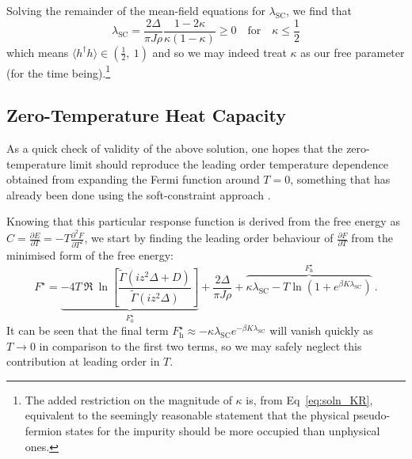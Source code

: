 \documentclass[12pt]{article}
\begin{document}
Solving the remainder of the mean-field equations for $ \lambda_{\text{SC}} $, we find that
\begin{equation}
\lambda_{\text{SC}} = \frac{2 \Delta}{\pi J \rho} \frac{1 - 2 \kappa}{\kappa (1 - \kappa)} \geq 0 \quad \text{for} \quad \kappa \leq \frac{1}{2}
\label{eq:soln_lambda_SC} %
\end{equation} which means $ \langle h^{\dagger} h \rangle \in (\frac{1}{2}, ~ 1) $ and so we may indeed treat $ \kappa $ as our free parameter (for the time being).\footnote{The added restriction on the magnitude of $ \kappa $ is, from Eq~\eqref{eq:soln_KR}, equivalent to the seemingly reasonable statement that the physical pseudo-fermion states for the impurity should be more occupied than unphysical ones.}

\subsection{Zero-Temperature Heat Capacity}

As a quick check of validity of the above solution, one hopes that the zero-temperature limit should reproduce the leading order temperature dependence obtained from expanding the Fermi function around $ T = 0 $, something that has already been done using the soft-constraint approach \cite{Draft}.

Knowing that this particular response function is derived from the free energy as $ C = \frac{\partial E}{\partial T} = - T \frac{\partial^{2} F}{\partial T ^2} $, we start by finding the leading order behaviour of $ \frac{\partial F}{\partial T} $ from the minimised form of the free energy:
\begin{equation}
F^{\star} = \underbrace{- 4 T ~ \Re{ ~ \ln{\left[ \frac{\widetilde{\Gamma}(i z^2 \Delta + D)}{\widetilde{\Gamma}(i z^2 \Delta)} \right]}}}_{F_0^{\star}} + \frac{2 \Delta}{\pi J \rho} + \overbrace{\kappa \lambda_{\text{SC}}  - T \ln{\left( 1 + e^{\beta K \lambda_{\text{SC}}} \right)}}^{F_{\text{h}}^{\star}} ~ .
\end{equation}
It can be seen that the final term $ F_{\text{h}}^{\star} \approx - \kappa \lambda_{\text{SC}} e^{- \beta K \lambda_{\text{SC}}} $ will vanish quickly as $ T \rightarrow 0 $ in comparison to the first two terms, so we may safely neglect this contribution at leading order in $ T $.
\end{document}
